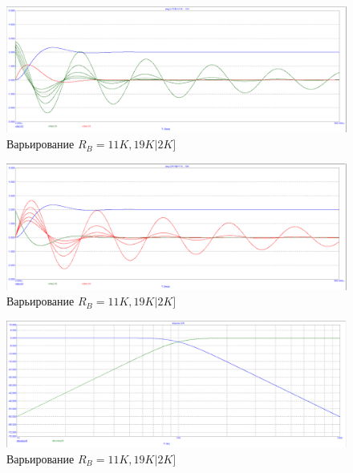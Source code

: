 \documentclass[15pt,a5paper,reqno]{article}
\begin{document}
\begin{figure}[h!]
    \centering
    \includegraphics[width=12cm]{pics/point4_2_var2.png}
    \caption{Варьирование $R_B  = 11K, 19K | 2K]$}
    \label{}
\end{figure}


\begin{figure}[h!]
    \centering
    \includegraphics[width=12cm]{pics/point4_2_var3.png}
    \caption{Варьирование $R_B  = 11K, 19K | 2K]$}
    \label{}
\end{figure}


\begin{figure}[h!]
    \centering
    \includegraphics[width=12cm]{pics/point4_3.png}
    \caption{Варьирование $R_B  = 11K, 19K | 2K]$}
    \label{}
\end{figure}
\end{document}
